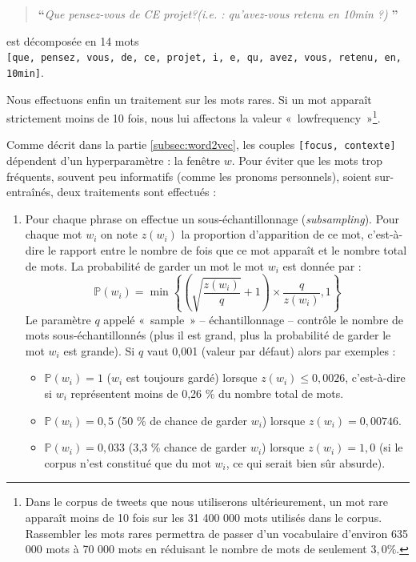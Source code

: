\documentclass[11pt,french,french]{article}
\providecommand{\tightlist}{%
  \setlength{\parskip}{0pt}
  }
\let\rmarkdownfootnote\footnote%
\def\footnote{\protect\rmarkdownfootnote}
\begin{document}
\begin{quote}
\LARGE \textbf{``}\normalsize \emph{Que pensez-vous de CE projet?(i.e. : qu'avez-vous retenu en 10min ?)} \LARGE \textbf{''}\normalsize
\end{quote}

est décomposée en 14 mots
\texttt{{[}que,\ pensez,\ vous,\ de,\ ce,\ projet,\ i,\ e,\ qu,\ avez,\ vous,\ retenu,\ en,\ 10min{]}}.

Nous effectuons enfin un traitement sur les mots rares. Si un mot
apparaît strictement moins de 10 fois, nous lui affectons la valeur
«~lowfrequency~»\footnote{Dans le corpus de tweets que nous utiliserons
  ultérieurement, un mot rare apparaît moins de 10 fois sur les 31 400
  000 mots utilisés dans le corpus. Rassembler les mots rares permettra
  de passer d'un vocabulaire d'environ 635 000 mots à 70 000 mots en
  réduisant le nombre de mots de seulement \(3,0 \%\).}.

Comme décrit dans la partie \ref{subsec:word2vec}, les couples
\texttt{{[}focus,\ contexte{]}} dépendent d'un hyperparamètre : la
fenêtre \(w\). Pour éviter que les mots trop fréquents, souvent peu
informatifs (comme les pronoms personnels), soient sur-entraînés, deux
traitements sont effectués :

\begin{enumerate}
\def\labelenumi{\arabic{enumi}.}
\item
  Pour chaque phrase on effectue un sous-échantillonnage
  (\emph{subsampling}). Pour chaque mot \(w_i\) on note \(z(w_i)\) la
  proportion d'apparition de ce mot, c'est-à-dire le rapport entre le
  nombre de fois que ce mot apparaît et le nombre total de mots. La
  probabilité de garder un mot le mot \(w_i\) est donnée par : \[
  \mathbb P(w_i) = \min\left\{\left(\sqrt{\frac{z(w_i)}{q}} + 1 \right)
  \times
  \frac{q}{z(w_i)},1\right\}
  \] Le paramètre \(q\) appelé «~sample~» -- échantillonnage -- contrôle
  le nombre de mots sous-échantillonnés (plus il est grand, plus la
  probabilité de garder le mot \(w_i\) est grande). Si \(q\) vaut 0,001
  (valeur par défaut) alors par exemples :

  \begin{itemize}
  \tightlist
  \item
    \(\mathbb P(w_i) = 1\) (\(w_i\) est toujours gardé) lorsque
    \(z(w_i)\leq 0,0026\), c'est-à-dire si \(w_i\) représentent moins de
    0,26 \% du nombre total de mots.\\
  \item
    \(\mathbb P(w_i) = 0,5\) (50 \% de chance de garder \(w_i\)) lorsque
    \(z(w_i)=0,00746\).\\
  \item
    \(\mathbb P(w_i) = 0,033\) (3,3 \% chance de garder \(w_i\)) lorsque
    \(z(w_i)=1,0\) (si le corpus n'est constitué que du mot \(w_i\), ce
    qui serait bien sûr absurde).
  \end{itemize}
\end{enumerate}
\end{document}
